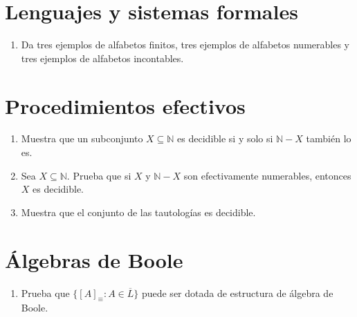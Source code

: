 \documentclass[letterpaper,DIV=15,headsepline,12pt]{scrartcl}
\newcommand{\mathds}[1]{\mathbb{#1}}
\begin{document}
    \newpage
    \section*{Lenguajes y sistemas formales}
        \begin{enumerate}
            \item Da tres ejemplos de alfabetos finitos, tres ejemplos de alfabetos numerables y tres ejemplos de alfabetos incontables.
        \end{enumerate}
    
    \newpage
    \section*{Procedimientos efectivos}
        \begin{enumerate}
            \item Muestra que un subconjunto $X\subseteq \mathds{N}$ es decidible si y solo si $\mathds{N}-X$ también lo es.
            \item Sea $X\subseteq \mathds{N}$. Prueba que si $X$ y $\mathds{N}-X$ son efectivamente numerables, entonces $X$ es decidible.
            \item Muestra que el conjunto de las tautologías es decidible.
        \end{enumerate}
    
    \newpage
    \section*{Álgebras de Boole}
        \begin{enumerate}
            \item Prueba que $\{[A]_\equiv : A\in\overline{L}\}$ puede ser dotada de estructura de álgebra de Boole.
        \end{enumerate}
    
    \newpage
\end{document}
